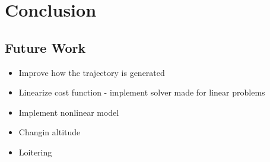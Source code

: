 \chapter{Conclusion}


\section{Future Work}

\begin{itemize}
	\item Improve how the trajectory is generated
	\item Linearize cost function - implement solver made for linear problems
	\item Implement nonlinear model
	\item Changin altitude
    \item Loitering
\end{itemize}